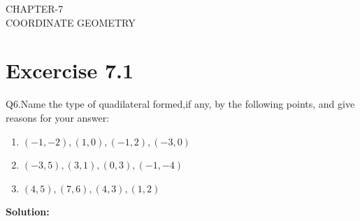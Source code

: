 \documentclass[12pt]{article}
\providecommand{\brak}[1]{\ensuremath{\left(#1\right)}}
\newcommand{\solution}{\noindent \textbf{Solution: }}
\begin{document}
\begin{center}
\textbf\large{CHAPTER-7 \\ COORDINATE GEOMETRY}

\end{center}
\section*{Excercise 7.1}

Q6.Name the type of quadilateral formed,if any, by the following points, and give reasons for your answer:
\begin{enumerate}
	\item $\brak{-1,-2}, \brak{1,0}, \brak{-1,2}, \brak{-3,0}$ 
	\item $\brak{-3,5}, \brak{3,1}, \brak{0,3}, \brak{-1,-4}$
	\item $\brak{4,5}, \brak{7,6}, \brak{4,3}, \brak{1,2}$
\end{enumerate}
\solution
\fi
\end{document}
